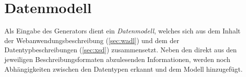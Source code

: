 \chapter{Datenmodell}

Als Eingabe des Generators dient ein \emph{Datenmodell}, welches sich aus dem Inhalt der Webanwendungsbeschreibung (\cref{sec:wadl}) und dem der Datentypbeschreibungen (\cref{sec:xsd}) zusammensetzt. 
Neben den direkt aus den jeweiligen Beschreibungsformaten abzulesenden Informationen, werden noch Abhängigkeiten zwischen den Datentypen erkannt und dem Modell hinzugefügt. %
